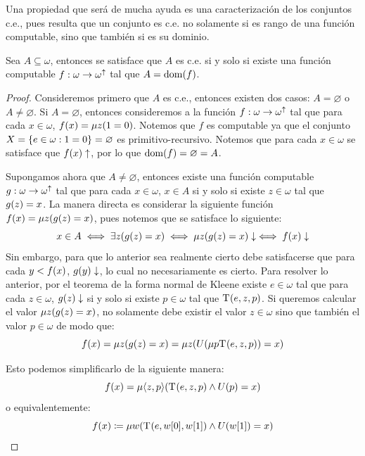 Una propiedad que será de mucha ayuda es una caracterización de los conjuntos c.e., pues resulta que un conjunto es c.e. no solamente si es rango de una función computable, sino que también si es su dominio.

\begin{theorem}
	\label{theo: caracterizacion_ce} %
	Sea $A\subseteq\omega$, entonces se satisface que $A$ es c.e. si y solo si existe una función computable $f:\omega\to\omega^{\DIVERGE}$ tal que $A =\DOMINIO{f}$.
\end{theorem}

\begin{proof}
	Consideremos primero que $A$ es c.e., entonces existen dos casos: $A =\varnothing$ o $A\neq\varnothing$. Si $A =\varnothing$, entonces consideremos a la función $f:\omega\to\omega^{\DIVERGE}$ tal que para cada $x\in\omega$, $f\pa*{x} =\mu z\pa*{1 = 0}$. Notemos que $f$ es computable ya que el conjunto $X =\set*{e\in\omega: 1 = 0} =\varnothing$ es primitivo-recursivo. Notemos que para cada $x\in\omega$ se satisface que $f\pa*{x}\DIVERGE$, por lo que $\DOMINIO{f} =\varnothing = A$.

	Supongamos ahora que $A\neq\varnothing$, entonces existe una función computable $g:\omega\to\omega^{\DIVERGE}$ tal que para cada $x\in\omega$, $x\in A$ si y solo si existe $z\in\omega$ tal que $g\pa*{z} = x$. La manera directa es considerar la siguiente función $f\pa*{x} =\mu z\pa*{g\pa*{z} = x}$, pues notemos que se satisface lo siguiente:
	\[
		x\in A\iff\exists z\pa*{g\pa*{z} = x}\iff\mu z\pa*{g\pa*{z} = x}\ACABA\iff f\pa*{x}\ACABA
	\]
	Sin embargo, para que lo anterior sea realmente cierto debe satisfacerse que para cada $y < f\pa*{x}$, $g\pa*{y}\ACABA$, lo cual no necesariamente es cierto. Para resolver lo anterior, por el teorema de la forma normal de Kleene existe $e\in\omega$ tal que para cada $z\in\omega$, $g\pa*{z}\ACABA$ si y solo si existe $p\in\omega$ tal que $\KLEENE\pa*{e, z, p}$. Si queremos calcular el valor $\mu z\pa*{g\pa*{z} = x}$, no solamente debe existir el valor $z\in\omega$ sino que también el valor $p\in\omega$ de modo que:
	\[
		f\pa*{x} =\mu z\pa*{g\pa*{z} = x} =\mu z\pa*{U\pa*{\mu p \KLEENE\pa*{e, z, p}} = x}
	\]

	Esto podemos simplificarlo de la siguiente manera:
	\[
		f\pa*{x} =\mu\inner*{z, p}\pa*{\KLEENE\pa*{e, z, p}\land U\pa*{p} = x}
	\]
	o equivalentemente:
	\[
		f\pa*{x}\coloneqq\mu w\pa*{\KLEENE\pa*{e, w\bra*{0}, w\bra*{1}}\land U\pa*{w\bra*{1}} = x}
	\]


\end{proof}
